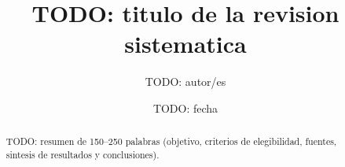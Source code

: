 \documentclass[11pt]{article}
\title{TODO: titulo de la revision sistematica}
\author{TODO: autor/es}
\date{TODO: fecha}
\begin{document}
\maketitle

\begin{abstract}
TODO: resumen de 150--250 palabras (objetivo, criterios de elegibilidad,
fuentes, sintesis de resultados y conclusiones).
\end{abstract}








\end{document}
